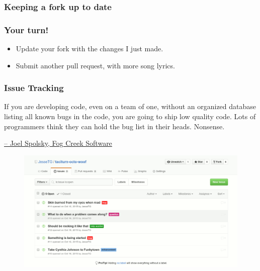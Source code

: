 \documentclass[glossy]{beamer}
\begin{document}
\begin{frame}[fragile=singleslide]
  \frametitle{Keeping a fork up to date}

\end{frame}

\begin{frame}[fragile=singleslide]
  \frametitle{Your turn!}

  \begin{itemize}
    \item Update your fork with the changes I just made.
    \item Submit another pull request, with more song lyrics.
  \end{itemize}
\end{frame}

\begin{frame}[fragile=singleslide]
  \frametitle{Issue Tracking}

  \begin{displayquote}
    If you are developing code, even on a team of one, without an organized database listing all known bugs in the code, you are going to ship low quality code. Lots of programmers think they can hold the bug list in their heads. Nonsense.
  \end{displayquote}

  \begin{flushright}
    \href{http://www.joelonsoftware.com/articles/fog0000000029.html}{-- Joel Spolsky, Fog Creek Software}
  \end{flushright}

  \begin{figure}
    \centering
    \includegraphics[width=0.75\columnwidth]{issues}
  \end{figure}
\end{frame}
\end{document}
